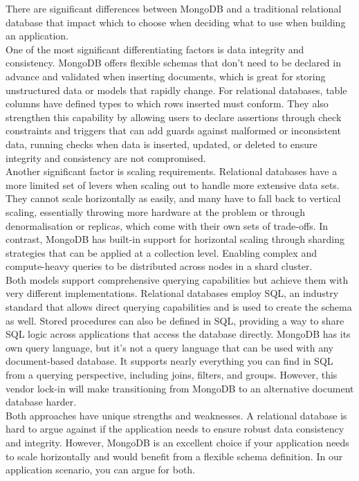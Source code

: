 \documentclass{article}
\begin{document}
There are significant differences between MongoDB and a traditional relational database that impact which to choose when deciding what to use when building an application.\\
\newline
One of the most significant differentiating factors is data integrity and consistency. MongoDB offers flexible schemas that don't need to be declared in advance and validated when inserting documents, which is great for storing unstructured data or models that rapidly change. For relational databases, table columns have defined types to which rows inserted must conform. They also strengthen this capability by allowing users to declare assertions through check constraints and triggers that can add guards against malformed or inconsistent data, running checks when data is inserted, updated, or deleted to ensure integrity and consistency are not compromised. \\
\newline
Another significant factor is scaling requirements. Relational databases have a more limited set of levers when scaling out to handle more extensive data sets. They cannot scale horizontally as easily, and many have to fall back to vertical scaling, essentially throwing more hardware at the problem or through denormalisation or replicas, which come with their own sets of trade-offs. In contrast, MongoDB has built-in support for horizontal scaling through sharding strategies that can be applied at a collection level. Enabling complex and compute-heavy queries to be distributed across nodes in a shard cluster. \\
\newline
Both models support comprehensive querying capabilities but achieve them with very different implementations. Relational databases employ SQL, an industry standard that allows direct querying capabilities and is used to create the schema as well. Stored procedures can also be defined in SQL, providing a way to share SQL logic across applications that access the database directly. MongoDB has its own query language, but it's not a query language that can be used with any document-based database. It supports nearly everything you can find in SQL from a querying perspective, including joins, filters, and groups. However, this vendor lock-in will make transitioning from MongoDB to an alternative document database harder. \\
\newline
Both approaches have unique strengths and weaknesses. A relational database is hard to argue against if the application needs to ensure robust data consistency and integrity. However, MongoDB is an excellent choice if your application needs to scale horizontally and would benefit from a flexible schema definition. In our application scenario, you can argue for both. \\
\end{document}
